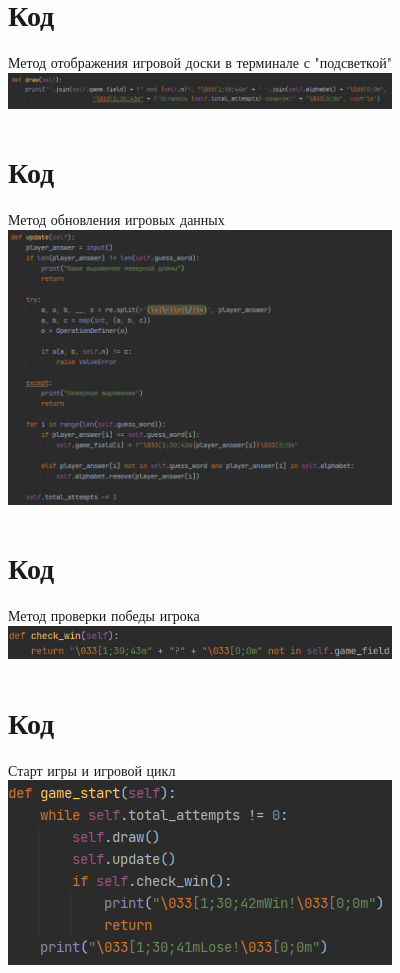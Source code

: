 \documentclass[handout]{beamer}
\begin{document}
    \section{Код}
    \begin{frame}{Метод отображения игровой доски в терминале с "подсветкой"}
        \centering\includegraphics[width=4in, keepaspectratio]{GE - Отображение.png}
    \end{frame}

    \section{Код}
    \begin{frame}{Метод обновления игровых данных}
        \centering\includegraphics[width=4in, keepaspectratio]{GE - Обновление.png}
    \end{frame}

    \section{Код}
    \begin{frame}{Метод проверки победы игрока}
        \centering\includegraphics[width=4in, keepaspectratio]{GE - Проверка победы.png}
    \end{frame}

    \section{Код}
    \begin{frame}{Старт игры и игровой цикл}     
        \centering\includegraphics[width=4in, keepaspectratio]{GE - Игровой цикл.png}
    \end{frame}
\end{document}
